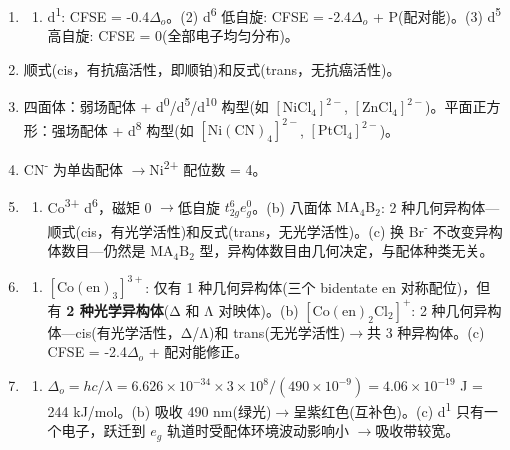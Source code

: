 \documentclass[a4paper,11pt]{ctexart}
\providecommand{\tightlist}{\setlength{\itemsep}{0pt}\setlength{\parskip}{0pt}}
\newcommand{\箭}{\ensuremath{\rightarrow}}
\newcommand{\左箭}{\ensuremath{\leftarrow}}
\newcommand{\上箭}{\ensuremath{\uparrow}}
\newcommand{\下箭}{\ensuremath{\downarrow}}
\newcommand{\衡}{\ensuremath{\rightleftharpoons}}
\newcommand{\双箭}{\ensuremath{\leftrightarrow}}
\newcommand{\约等于}{\ensuremath{\approx}}
\newcommand{\小于等于}{\ensuremath{\leq}}
\newcommand{\大于等于}{\ensuremath{\geq}}
\newcommand{\不等于}{\ensuremath{\neq}}
\newcommand{\西格马}{\ensuremath{\sigma}}
\newcommand{\派}{\ensuremath{\pi}}
\begin{document}
\begin{enumerate}
\begin{enumerate}
  \end{enumerate}
\item
  \begin{enumerate}
  \def\labelenumii{(\arabic{enumii})}
  \tightlist
  \item
    d\textsuperscript{1}: CFSE = -0.4\(\Delta_o\)。(2) d\textsuperscript{6} 低自旋: CFSE = -2.4\(\Delta_o\) + P(配对能)。(3) d\textsuperscript{5} 高自旋: CFSE = 0(全部电子均匀分布)。
  \end{enumerate}
\item
  顺式(cis，有抗癌活性，即顺铂)和反式(trans，无抗癌活性)。
\item
  四面体：弱场配体 + d\textsuperscript{0}/d\textsuperscript{5}/d\textsuperscript{10} 构型(如 \(\mathrm{[NiCl_4]^{2-}}\), \(\mathrm{[ZnCl_4]^{2-}}\))。平面正方形：强场配体 + d\textsuperscript{8} 构型(如 \(\mathrm{[Ni(CN)_4]^{2-}}\), \(\mathrm{[PtCl_4]^{2-}}\))。
\item
  CN\textsuperscript{-} 为单齿配体 \箭 Ni\textsuperscript{2+} 配位数 = 4。
\item
  \begin{enumerate}
  \def\labelenumii{(\alph{enumii})}
  \tightlist
  \item
    Co\textsuperscript{3+} d\textsuperscript{6}，磁矩 0 \箭 低自旋 \(t_{2g}^6 e_g^0\)。(b) 八面体 \(\mathrm{MA_4B_2}\): 2 种几何异构体---顺式(cis，有光学活性)和反式(trans，无光学活性)。(c) 换 Br\textsuperscript{-} 不改变异构体数目---仍然是 \(\mathrm{MA_4B_2}\) 型，异构体数目由几何决定，与配体种类无关。
  \end{enumerate}
\item
  \begin{enumerate}
  \def\labelenumii{(\alph{enumii})}
  \tightlist
  \item
    \(\mathrm{[Co(en)_3]^{3+}}\): 仅有 1 种几何异构体(三个 bidentate en 对称配位)，但有 \textbf{2 种光学异构体}(Δ 和 Λ 对映体)。(b) \(\mathrm{[Co(en)_2Cl_2]^+}\): 2 种几何异构体---cis(有光学活性，Δ/Λ)和 trans(无光学活性)\箭 共 3 种异构体。(c) CFSE = -2.4\(\Delta_o\) + 配对能修正。
  \end{enumerate}
\item
  \begin{enumerate}
  \def\labelenumii{(\alph{enumii})}
  \tightlist
  \item
    \(\Delta_o = hc/\lambda = 6.626\times10^{-34}\times3\times10^8/(490\times10^{-9}) = 4.06\times10^{-19}\) J = 244 kJ/mol。(b) 吸收 490 nm(绿光)\箭 呈紫红色(互补色)。(c) d\textsuperscript{1} 只有一个电子，跃迁到 \(e_g\) 轨道时受配体环境波动影响小 \箭 吸收带较宽。

\end{enumerate}
\end{enumerate}
\end{document}
